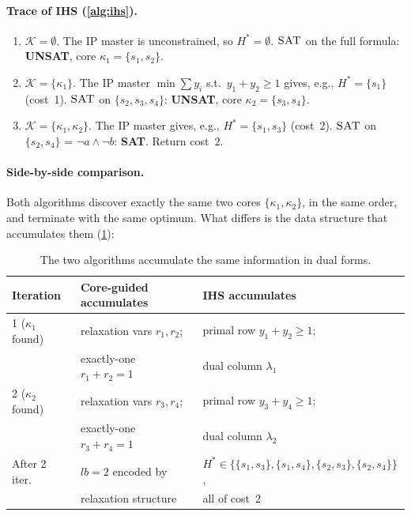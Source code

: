 \paragraph{Trace of IHS (\cref{alg:ihs}).}
\begin{enumerate}
\item $\mathcal{K} = \emptyset$. The IP master is unconstrained, so $H^* =
\emptyset$. $\textsc{SAT}$ on the full formula: \textbf{UNSAT}, core
$\kappa_1 = \{s_1, s_2\}$.
\item $\mathcal{K} = \{\kappa_1\}$. The IP master $\min\sum y_i$ s.t.\
$y_1 + y_2 \geq 1$ gives, e.g., $H^* = \{s_1\}$ (cost~1). $\textsc{SAT}$ on
$\{s_2, s_3, s_4\}$: \textbf{UNSAT}, core $\kappa_2 = \{s_3, s_4\}$.
\item $\mathcal{K} = \{\kappa_1, \kappa_2\}$. The IP master gives, e.g.,
$H^* = \{s_1, s_3\}$ (cost~2). $\textsc{SAT}$ on $\{s_2, s_4\}$ = $\neg a
\wedge \neg b$: \textbf{SAT}. Return cost~$2$.
\end{enumerate}

\paragraph{Side-by-side comparison.} Both algorithms discover exactly the
same two cores $\{\kappa_1, \kappa_2\}$, in the same order, and terminate with
the same optimum. What differs is the data structure that accumulates them
(\cref{tab:trace}):

\begin{table}[htbp]
\centering
\caption{The two algorithms accumulate the same information in dual forms.}
\label{tab:trace}
\begin{tabular}{lll}
\toprule
\textbf{Iteration} & \textbf{Core-guided accumulates} & \textbf{IHS accumulates} \\
\midrule
1 ($\kappa_1$ found) & relaxation vars $r_1, r_2$;     & primal row $y_1 + y_2 \geq 1$;     \\
                     & exactly-one $r_1 + r_2 = 1$     & dual column $\lambda_1$            \\
2 ($\kappa_2$ found) & relaxation vars $r_3, r_4$;     & primal row $y_3 + y_4 \geq 1$;     \\
                     & exactly-one $r_3 + r_4 = 1$     & dual column $\lambda_2$            \\
\midrule
After 2 iter.\ & $\mathit{lb} = 2$ encoded by         & $H^* \in \{ \{s_1,s_3\}, \{s_1,s_4\}, \{s_2,s_3\}, \{s_2,s_4\} \}$, \\
               & relaxation structure                  & all of cost~2 \\
\bottomrule
\end{tabular}
\end{table}

